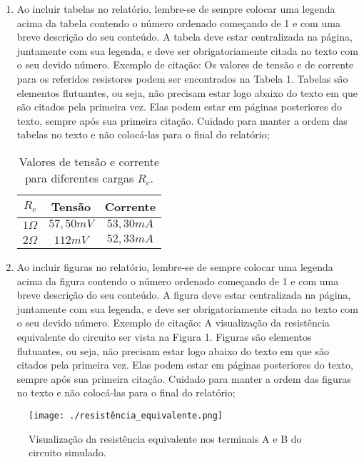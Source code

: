\documentclass[12pt]{article}
\begin{document}
\begin{enumerate}
\item Ao incluir tabelas no relatório, lembre-se de sempre colocar uma legenda acima da tabela contendo o número ordenado começando de 1 e com uma breve descrição do seu conteúdo. A tabela deve estar centralizada na página, juntamente com sua legenda, e deve ser obrigatoriamente citada no texto com o seu devido número. Exemplo de citação: Os valores de tensão e de corrente para os referidos resistores podem ser encontrados na Tabela 1. Tabelas são elementos flutuantes, ou seja, não precisam estar logo abaixo do texto em que são citados pela primeira vez. Elas podem estar em páginas posteriores do texto, sempre após sua primeira citação. Cuidado para manter a ordem das tabelas no texto e não colocá-las para o final do relatório;
\begin{table}[htbp]
\caption{\label{valores}Valores de tensão e corrente para diferentes cargas \(R_c\).}
\centering
\begin{tabular}{|c|c|c|}
\hline
\(R_c\) & Tensão & Corrente\\
\hline
\(1 \Omega\) & \(57,50 mV\) & \(53,30 mA\)\\
\hline
\(2 \Omega\) & \(112 mV\) & \(52,33 mA\)\\
\hline
\end{tabular}
\end{table}

\setcounter{enumi}{11}
\item Ao incluir figuras no relatório, lembre-se de sempre colocar uma legenda acima da figura contendo o número ordenado começando de 1 e com uma breve descrição do seu conteúdo. A figura deve estar centralizada na página, juntamente com sua legenda, e deve ser obrigatoriamente citada no texto com o seu devido número. Exemplo de citação: A visualização da resistência equivalente do circuito ser vista na Figura 1. Figuras são elementos flutuantes, ou seja, não precisam estar logo abaixo do texto em que são citados pela primeira vez. Elas podem estar em páginas posteriores do texto, sempre após sua primeira citação. Cuidado para manter a ordem das figuras no texto e não colocá-las para o final do relatório;
\end{enumerate}
\begin{figure}[htbp]
\caption{\label{fig:resistência_equivalente}Visualização da resistência equivalente nos terminais A e B do circuito simulado.}
\centering
\texttt{[image: ./resistência\_equivalente.png]}
\end{figure}
\end{document}
